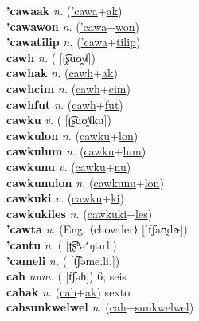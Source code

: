 \textbf{'cawaak} \textit{n.} (\hyperref['cawa]{'cawa}+\hyperref[ak]{ak})
 \label{'cawaak} \\
\textbf{'cawawon} \textit{n.} (\hyperref['cawa]{'cawa}+\hyperref[won]{won})
 \label{'cawawon} \\
\textbf{'cawatilip} \textit{n.} (\hyperref['cawa]{'cawa}+\hyperref[tilip]{tilip})
 \label{'cawatilip} \\
\textbf{cawh} \textit{n.} ( [ʈ͡ʂɑʊ̯˧˩˧])
 \label{cawh} \\
\textbf{cawhak} \textit{n.} (\hyperref[cawh]{cawh}+\hyperref[ak]{ak})
 \label{cawhak} \\
\textbf{cawhcim} \textit{n.} (\hyperref[cawh]{cawh}+\hyperref[cim]{cim})
 \label{cawhcim} \\
\textbf{cawhfut} \textit{n.} (\hyperref[cawh]{cawh}+\hyperref[fut]{fut})
 \label{cawhfut} \\
\textbf{cawku} \textit{v.} ( [ʈ͡ʂɑʊ̯˥˩ku])
 \label{cawku} \\
\textbf{cawkulon} \textit{n.} (\hyperref[cawku]{cawku}+\hyperref[lon]{lon})
 \label{cawkulon} \\
\textbf{cawkulum} \textit{n.} (\hyperref[cawku]{cawku}+\hyperref[lum]{lum})
 \label{cawkulum} \\
\textbf{cawkunu} \textit{v.} (\hyperref[cawku]{cawku}+\hyperref[nu]{nu})
 \label{cawkunu} \\
\textbf{cawkunulon} \textit{n.} (\hyperref[cawkunu]{cawkunu}+\hyperref[lon]{lon})
 \label{cawkunulon} \\
\textbf{cawkuki} \textit{v.} (\hyperref[cawku]{cawku}+\hyperref[ki]{ki})
 \label{cawkuki} \\
\textbf{cawkukiles} \textit{n.} (\hyperref[cawkuki]{cawkuki}+\hyperref[les]{les})
 \label{cawkukiles} \\
\textbf{'cawta} \textit{n.} (Eng. ⟨chowder⟩ [ˈt͡ʃaʊ̯dɚ])
 \label{'cawta} \\
\textbf{'cantu} \textit{n.} ( [ʈ͡ʂʰə˧˥ŋtu˥])
 \label{'cantu} \\
\textbf{'cameli} \textit{n.} ( [t͡ʃəmeːliː])
 \label{'cameli} \\
\textbf{cah} \textit{num.} ( [t͡ʃəɦ])
6; seis \label{cah} \\
\textbf{cahak} \textit{n.} (\hyperref[cah]{cah}+\hyperref[ak]{ak})
sexto \label{cahak} \\
\textbf{cahsunkwelwel} \textit{n.} (\hyperref[cah]{cah}+\hyperref[sunkwelwel]{sunkwelwel})
 \label{cahsunkwelwel} \\

